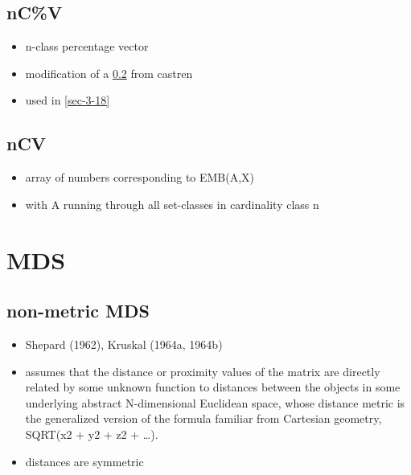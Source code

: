 \documentclass[11pt]{article}
\begin{document}
{{\subsection{nC\%V}
\label{sec-21-21}
\begin{itemize}
\item n-class percentage vector
\item modification of a \ref{sec-21-22} from castren
\item used in \ref{sec-3-18}
\end{itemize}

\subsection{nCV}
\label{sec-21-22}
\begin{itemize}
\item array of numbers corresponding to EMB(A,X)
\item with A running through all set-classes in cardinality class n
\end{itemize}

\section{MDS}
\label{sec-22}
\subsection{non-metric MDS}
\label{sec-22-1}
\begin{itemize}
\item Shepard (1962), Kruskal (1964a, 1964b)
\item assumes that the distance or proximity values of the matrix are
directly related by some unknown function to distances between
the objects in some underlying abstract N-dimensional Euclidean
space, whose distance metric is the generalized version of the
formula familiar from Cartesian geometry, SQRT(x2 + y2 + z2 +
\ldots{}).
\item distances are symmetric
\end{itemize}

}}
\end{document}
